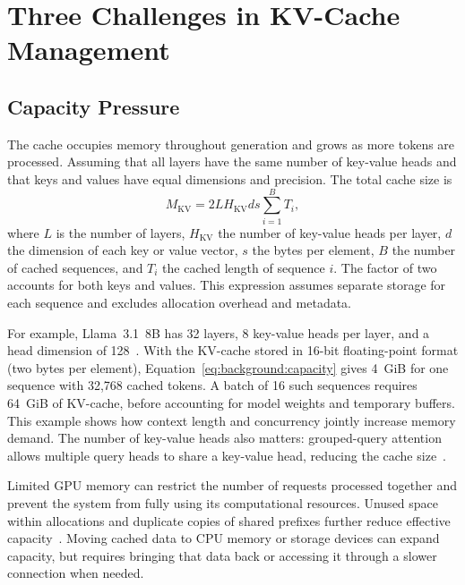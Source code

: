 \section{Three Challenges in KV-Cache Management}\label{sec:background:challenges}

\subsection{Capacity Pressure}

The cache occupies memory throughout generation and grows as more tokens are processed. Assuming that all layers have the same number of key-value heads and that keys and values have equal dimensions and precision. The total cache size is
\begin{equation}
    M_{\mathrm{KV}} = 2 L H_{\mathrm{KV}} d s
        \sum_{i=1}^{B} T_i,
    \label{eq:background:capacity}
\end{equation}
where $L$ is the number of layers, $H_{\mathrm{KV}}$ the number of key-value heads per layer, $d$ the dimension of each key or value vector, $s$ the bytes per element, $B$ the number of cached sequences, and $T_i$ the cached length of sequence $i$. The factor of two accounts for both keys and values. This expression assumes separate storage for each sequence and excludes allocation overhead and metadata.

For example, Llama~3.1~8B has 32 layers, 8 key-value heads per layer, and a head dimension of 128~\cite{kv_llama2024herd}. With the KV-cache stored in 16-bit floating-point format (two bytes per element), Equation~\ref{eq:background:capacity} gives 4~GiB for one sequence with 32,768 cached tokens. A batch of 16 such sequences requires 64~GiB of KV-cache, before accounting for model weights and temporary buffers. This example shows how context length and concurrency jointly increase memory demand. The number of key-value heads also matters: grouped-query attention allows multiple query heads to share a key-value head, reducing the cache size~\cite{kv_ainslie2023gqa}.

Limited GPU memory can restrict the number of requests processed together and prevent the system from fully using its computational resources. Unused space within allocations and duplicate copies of shared prefixes further reduce effective capacity~\cite{kv_kwon2023pagedattention}. Moving cached data to CPU memory or storage devices can expand capacity, but requires bringing that data back or accessing it through a slower connection when needed.


